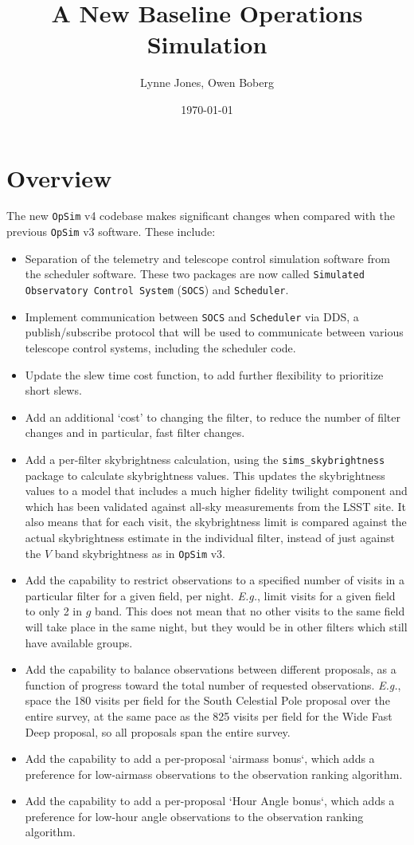 \documentclass[DM,lsstdraft,authoryear,toc]{lsstdoc}
\title{A New Baseline Operations Simulation}
\author{%
Lynne Jones, 
Owen Boberg
}
\date{\today}
\newcommand{\opsim}{\texttt{OpSim}\xspace}
\newcommand{\socs}{\texttt{SOCS}\xspace}
\newcommand{\sched}{\texttt{Scheduler}\xspace}
\newcommand{\simsky}{\texttt{sims\_skybrightness}\xspace}
\begin{document}
\maketitle

\section{Overview}

The new \opsim v4 codebase makes significant changes when compared with the previous \opsim v3 software. These include: 
\begin{itemize}
\item Separation of the telemetry and telescope control simulation software from the scheduler software. These two packages are now called \texttt{Simulated Observatory Control System} (\socs) and \texttt{Scheduler}. 
\item Implement communication between \socs and \sched via DDS, a publish/subscribe protocol that will be used to communicate between various telescope control systems, including the scheduler code.
\item Update the slew time cost function, to add further flexibility to prioritize short slews.
\item Add an additional `cost' to changing the filter, to reduce the number of filter changes and in particular, fast filter changes.
\item Add a per-filter skybrightness calculation, using the \simsky package to calculate skybrightness values. This updates the skybrightness values to a model that includes a much higher fidelity twilight component and which has been validated against all-sky measurements from the LSST site. It also means that for each visit, the skybrightness limit is compared against the actual skybrightness estimate in the individual filter, instead of just against the $V$ band skybrightness as in \opsim v3.
\item Add the capability to restrict observations to a specified number of visits in a particular filter for a given field, per night. {\it E.g.}, limit visits for a given field to only 2 in $g$ band. This does not mean that no other visits to the same field will take place in the same night, but they would be in other filters which still have available groups. 
\item Add the capability to balance observations between different proposals, as a function of progress toward the total number of requested observations. {\it E.g.}, space the 180 visits per field for the South Celestial Pole proposal over the entire survey, at the same pace as the 825 visits per field for the Wide Fast Deep proposal, so all proposals span the entire survey.
\item Add the capability to add a per-proposal `airmass bonus`, which adds a preference for low-airmass observations to the observation ranking algorithm.
\item Add the capability to add a per-proposal `Hour Angle bonus`, which adds a preference for low-hour angle observations to the observation ranking algorithm. 
\end{itemize}
\end{document}
